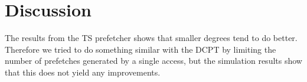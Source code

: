 \section{Discussion}

The results from the TS prefetcher shows that smaller degrees tend
to do better. Therefore we tried to do something similar with the DCPT by limiting the
number of prefetches generated by a single access, but the simulation
results show that this does not yield any improvements.
